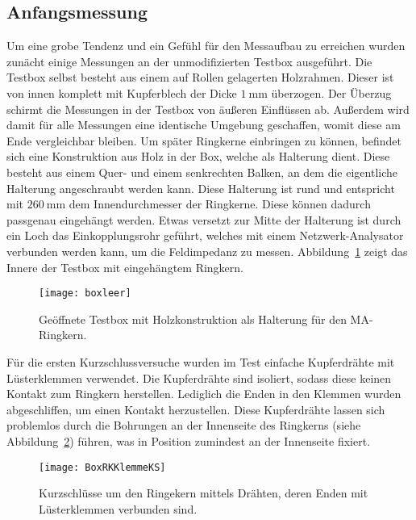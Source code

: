\subsection{Anfangsmessung}
Um eine grobe Tendenz und ein Gef\"uhl f\"ur den Messaufbau zu erreichen wurden zun\"acht einige Messungen an der unmodifizierten Testbox ausgef\"uhrt. Die Testbox selbst besteht aus einem auf Rollen gelagerten Holzrahmen. Dieser ist von innen komplett mit Kupferblech der Dicke $\SI{1}{\milli\meter}$ \"uberzogen. Der Überzug schirmt die Messungen in der Testbox von \"au\ss{}eren Einfl\"ussen ab. Au\ss{}erdem wird damit f\"ur alle Messungen eine identische Umgebung geschaffen, womit diese am Ende vergleichbar bleiben. Um sp\"ater Ringkerne einbringen zu k\"onnen, befindet sich eine Konstruktion aus Holz in der Box, welche als Halterung dient. Diese besteht aus einem Quer- und einem senkrechten Balken, an dem die eigentliche Halterung angeschraubt werden kann. Diese Halterung ist rund und entspricht mit $\SI{260}{\milli\meter}$ dem Innendurchmesser der Ringkerne. Diese k\"onnen dadurch passgenau eingeh\"angt werden. Etwas versetzt zur Mitte der Halterung ist durch ein Loch das Einkopplungsrohr gef\"uhrt, welches mit einem Netzwerk-Analysator verbunden werden kann, um die Feldimpedanz zu messen. Abbildung~\ref{fig:leereBox} zeigt das Innere der Testbox mit eingeh\"angtem Ringkern.
\par
\begin{figure}[htb]
		\centering
		\texttt{[image: boxleer]}
		\caption{Ge\"offnete Testbox mit Holzkonstruktion als Halterung f\"ur den MA-Ringkern.}
		\label{fig:leereBox}
\end{figure}
F\"ur die ersten Kurzschlussversuche wurden im Test einfache Kupferdr\"ahte mit L\"usterklemmen verwendet. Die Kupferdr\"ahte sind isoliert, sodass diese keinen Kontakt zum Ringkern herstellen. Lediglich die Enden in den Klemmen wurden abgeschliffen, um einen Kontakt herzustellen. Diese Kupferdr\"ahte lassen sich problemlos durch die Bohrungen an der Innenseite des Ringkerns (siehe Abbildung~\ref{fig:innenKern}) f\"uhren, was in Position zumindest an der Innenseite fixiert.
\par
\begin{figure}[htb]
		\centering
		\texttt{[image: BoxRKKlemmeKS]}
		\caption{Kurzschl\"usse um den Ringekern mittels Dr\"ahten, deren Enden mit L\"usterklemmen verbunden sind.}
		\label{fig:innenKern}
\end{figure}


